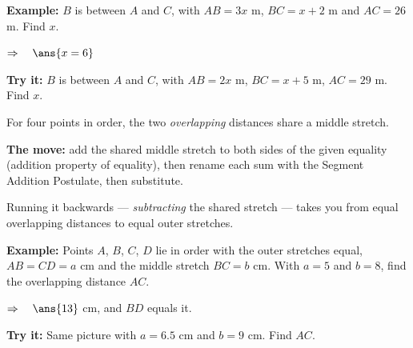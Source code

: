 \documentclass[12pt]{article}
\begin{document}
\begin{examplebox}
\textbf{Example:} \quad $B$ is between $A$ and $C$, with $AB = 3x$ m, $BC = x + 2$ m and $AC = 26$ m. Find $x$.

$\Rightarrow\quad \ans{x = 6}$
\end{examplebox}

\begin{tryitbox}
\textbf{Try it:} \quad $B$ is between $A$ and $C$, with $AB = 2x$ m, $BC = x + 5$ m, $AC = 29$ m. Find $x$.\\[2pt]
\end{tryitbox}


\begin{formulabox}
For four points in order, the two \emph{overlapping} distances share a middle stretch.\par
\textbf{The move:} add the shared middle stretch to both sides of the given equality (addition property of equality), then rename each sum with the Segment Addition Postulate, then substitute.\par
Running it backwards --- \emph{subtracting} the shared stretch --- takes you from equal overlapping distances to equal outer stretches.
\end{formulabox}

\begin{examplebox}
\textbf{Example:} \quad Points $A$, $B$, $C$, $D$ lie in order with the outer stretches equal, $AB = CD = a$ cm and the middle stretch $BC = b$ cm. With $a = 5$ and $b = 8$, find the overlapping distance $AC$.

$\Rightarrow\quad \ans{13}$ cm, and $BD$ equals it.
\end{examplebox}

\begin{tryitbox}
\textbf{Try it:} \quad Same picture with $a = 6.5$ cm and $b = 9$ cm. Find $AC$.\\[2pt]
\end{tryitbox}
\end{document}

